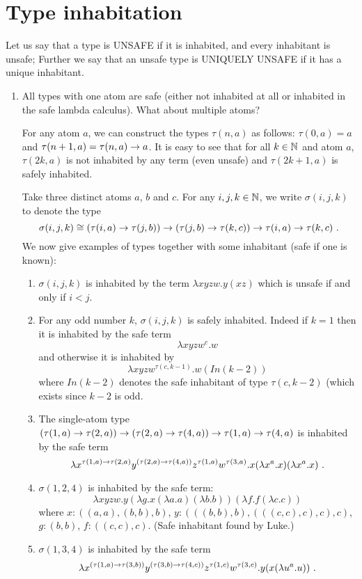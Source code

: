 \documentclass{article}
\begin{document}
\section{Type inhabitation}

Let us say that a type is UNSAFE if it is inhabited, and every
inhabitant is unsafe; Further we say that an unsafe type is UNIQUELY
UNSAFE if it has a unique inhabitant.

\begin{enumerate}

\item All types with one atom are safe (either not inhabited at all or inhabited in the safe lambda calculus). What about multiple atoms?

For any atom $a$, we can construct the types $\tau(n,a)$
as follows: $\tau(0,a) = a$ and $\tau(n+1,a) = \tau(n,a) \rightarrow a$.
It is easy to see that for all $k\in\mathbb{N}$ and atom $a$, $\tau(2k,a)$ is not inhabited by any term (even unsafe) and $\tau(2k+1,a)$ is safely inhabited.

Take three distinct atoms $a$, $b$ and $c$. For any $i,j,k\in\mathbb{N}$, we write $\sigma(i,j,k)$ to denote the type
$$\sigma(i,j,k) \cong (\tau(i,a) \rightarrow \tau(j,b)) \rightarrow (\tau(j,b) \rightarrow \tau(k,c)) \rightarrow \tau(i,a) \rightarrow
\tau(k,c) \ .$$
We now give examples of types together with some inhabitant (safe if one is known):
\begin{enumerate}
\item $\sigma(i,j,k)$ is inhabited by the term $\lambda x y z w . y (x z)$ which is unsafe if and only if $i<j$.

\item For any odd number $k$, $\sigma(i,j,k)$ is safely inhabited. Indeed if $k=1$ then it is inhabited by the safe term
    $$\lambda x y z w^c. w$$
    and otherwise it is inhabited by
    $$\lambda x y z w^{\tau(c,k-1)}. w (In(k-2))$$
    where $In(k-2)$ denotes the safe inhabitant of type $\tau(c,k-2)$ (which exists since $k-2$ is odd.

\item The single-atom type
$(\tau(1,a) \rightarrow \tau(2,a)) \rightarrow (\tau(2,a) \rightarrow \tau(4,a)) \rightarrow \tau(1,a) \rightarrow
\tau(4,a)$ is inhabited by the safe term $$\lambda x^{\tau(1,a)
\typear \tau(2,a)} y^{(\tau(2,a) \typear \tau(4,a))} z^{\tau(1,a)}
w^{\tau(3,a)} . x (\lambda x^a . x) (\lambda x^a . x)\ .$$

\item $\sigma(1,2,4)$
is inhabited by the safe term:
$$ \lambda x y z w . y (\lambda g . x (\lambda a . a) (\lambda b . b)) (\lambda f . f (\lambda c . c))$$
where
$x : ((a, a), (b, b), b)$,
$y : (((b, b), b), (((c, c), c), c), c)$,
$g : (b, b)$,
$f : ((c, c), c)$. (Safe inhabitant found by Luke.)
\item
$\sigma(1,3,4)$
is inhabited by the safe term
$$ \lambda x^{(\tau(1,a) \typear \tau(3,b))} y^{(\tau(3,b) \typear \tau(4,c))} z^{\tau(1,c)} w^{\tau(3,c)} . y (x (\lambda u^a . u)) \ .$$


\end{enumerate}
\end{enumerate}
\end{document}
